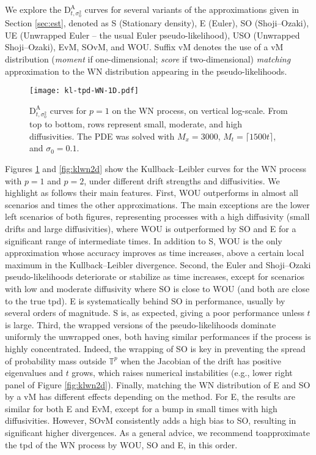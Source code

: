 \documentclass[oneside,11pt]{article}
\newcommand{\T}{\mathbb{T}}
\begin{document}
We explore the $\mathrm{D}^\mathrm{A}_{t,\sigma_0^2}$ curves for several variants of the approximations given in Section \ref{sec:est}, denoted as S (Stationary density), E (Euler), SO (Shoji--Ozaki), UE (Unwrapped Euler -- the usual Euler pseudo-likelihood), USO (Unwrapped Shoji--Ozaki), EvM, SOvM, and WOU. Suffix vM denotes the use of a vM distribution (\textit{moment} if one-dimensional; \textit{score} if two-dimensional) \textit{matching} approximation to the WN distribution appearing in the pseudo-likelihoods. 

\begin{figure}[!h]
	\vspace*{-0.25cm}
	\centering
	\texttt{[image: kl-tpd-WN-1D.pdf]}
	\vspace*{-0.5cm}
	\caption{\small $\mathrm{D}^\mathrm{A}_{t,\sigma_0^2}$ curves for $p=1$ on the WN process, on vertical log-scale. From top to bottom, rows represent small, moderate, and high diffusivities. The PDE was solved with $M_x=3000$, $M_t=\lceil 1500t\rceil$, and $\sigma_0=0.1$.}
	\label{fig:klwn1d}
\end{figure}

Figures \ref{fig:klwn1d} and \ref{fig:klwn2d} show the Kullback--Leibler curves for the WN process with $p=1$ and $p=2$, under different drift strengths and diffusivities. We highlight as follows their main features. First, WOU outperforms in almost all scenarios and times the other approximations. The main exceptions are the lower left scenarios of both figures, representing processes with a high diffusivity (small drifts and large diffusivities), where WOU is outperformed by SO and E for a significant range of intermediate times. In addition to S, WOU is the only approximation whose accuracy improves as time increases, above a certain local maximum in the Kullback--Leibler divergence. Second, the Euler and Shoji--Ozaki pseudo-likelihoods deteriorate or stabilize as time increases, except for scenarios with low and moderate diffusivity where SO is close to WOU (and both are close to the true tpd). E is systematically behind SO in performance, usually by several orders of magnitude. S is, as expected, giving a poor performance unless $t$ is large. Third, the wrapped versions of the pseudo-likelihoods dominate uniformly the unwrapped ones, both having similar performances if the process is highly concentrated. Indeed, the wrapping of SO is key in preventing the spread of probability mass outside $\T^p$ when the Jacobian of the drift has positive eigenvalues and $t$ grows, which raises numerical instabilities (e.g., lower right panel of Figure \ref{fig:klwn2d}). Finally, matching the WN distribution of E and SO by a vM has different effects depending on the method. For E, the results are similar for both E and EvM, except for a bump in small times with high diffusivities. However, SOvM consistently adds a high bias to SO, resulting in significant higher divergences. As a general advice, we recommend to\nopagebreak[4] approximate the tpd of the WN process by WOU, SO and E, in this order. 
\end{document}
